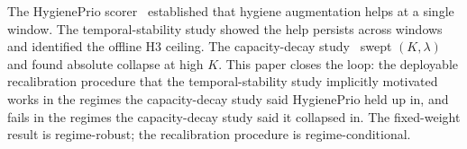 The HygienePrio scorer~\cite{paper4hygieneprio} established that hygiene augmentation
helps at a single window. The temporal-stability study showed the
help persists across windows and identified the offline H3 ceiling.
The capacity-decay study~\cite{paper6capacity} swept $(K, \lambda)$ and found
absolute collapse at high $K$. This paper closes the loop: the
deployable recalibration procedure that the temporal-stability study implicitly motivated
works in the regimes the capacity-decay study said HygienePrio held up in, and fails
in the regimes the capacity-decay study said it collapsed in. The fixed-weight result
is regime-robust; the recalibration procedure is regime-conditional.
